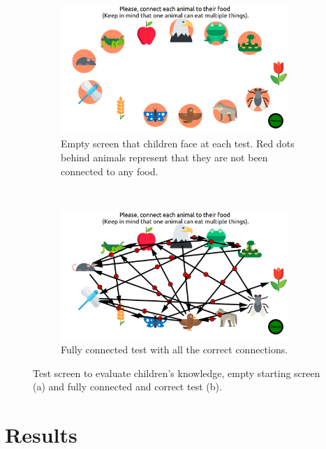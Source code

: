 \begin{figure}[ht]
	\centering
	\begin{subfigure}[t]{0.5\textwidth}
		\centering
		\includegraphics[width=0.95\textwidth]{empty_graph.png}
		\captionsetup{width=.95\linewidth}
		\caption{Empty screen that children face at each test. Red dots behind animals represent that they are not been connected to any food.}
		\end{subfigure}%
		~ 
		\begin{subfigure}[t]{0.5\textwidth}
			\centering
			\includegraphics[width=0.95\textwidth]{full_graph.png}
			\captionsetup{width=.95\linewidth}
			\caption{Fully connected test with all the correct connections.}
			\end{subfigure}
			\caption{Test screen to evaluate children's knowledge, empty starting screen (a) and fully connected and correct test (b).}
			\label{fig:test}
			\end{figure}
			
\section{Results}


